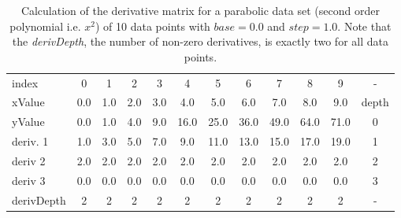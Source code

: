 \documentclass[main.tex]{subfiles}
\begin{document}
  
  \begin{table}[h]
    \caption{Calculation of the derivative matrix for a parabolic data set (second order polynomial i.e. $x^2$) of 10 data points with $base=0.0$ and $step=1.0$. Note that the \textit{derivDepth}, the number of non-zero derivatives, is exactly two for all data points.}
    \centering
    \begin{tabularx}{0.95\textwidth}{ X | c c c c c c c c c c || c }
      index & 0 & 1 & 2 & 3 & 4 & 5 & 6 & 7 & 8 & 9 &  -\\
      xValue & 0.0 & 1.0 & 2.0 & 3.0 & 4.0 & 5.0 & 6.0 & 7.0 & 8.0 & 9.0 & depth\\
      \hline \hline
      yValue & 0.0 & 1.0 & 4.0 & 9.0 & 16.0 & 25.0 & 36.0 &  49.0 & 64.0 & 71.0 & 0 \\
      \hline
      deriv. 1 & 1.0 & 3.0 & 5.0 & 7.0 & 9.0 & 11.0 & 13.0 & 15.0 & 17.0 & 19.0 & 1\\
      deriv 2 & 2.0 & 2.0 & 2.0 & 2.0 & 2.0 & 2.0 & 2.0 & 2.0 & 2.0 & 2.0 & 2\\
      deriv 3 & 0.0 & 0.0 & 0.0 & 0.0 & 0.0 & 0.0 & 0.0 & 0.0 & 0.0 & 0.0 & 3\\   
      \hline
      derivDepth & 2 & 2 & 2 & 2 & 2 & 2 & 2 & 2 & 2 & 2 & - \\   
    \end{tabularx}
    \label{tbl:mtrx:simple}
  \end{table}
  
\end{document}
